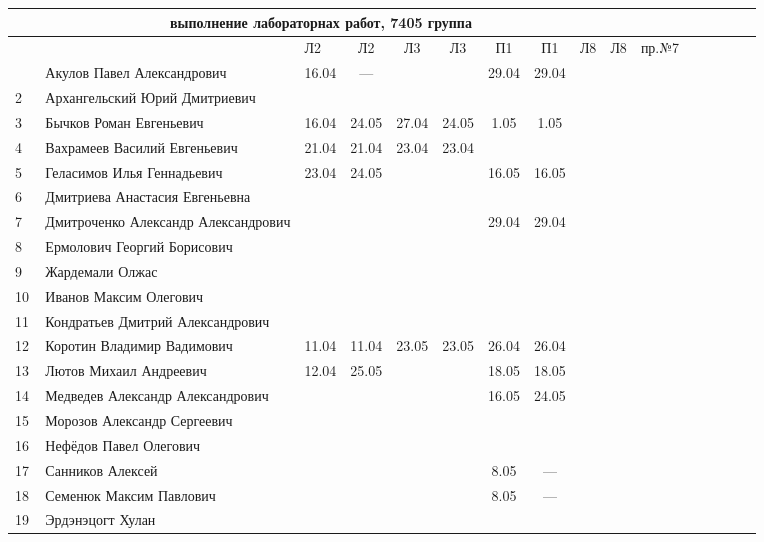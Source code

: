 \documentclass[a4paper,11pt]{article}
\begin{document}
\newpage
%
\hspace{-2cm} %
\begin{tabular}{l|llccccccccccccc}
\multicolumn{10}{c}{выполнение лабораторнах работ, 7405 группа} \\
\toprule
&&Л2&Л2& Л3&Л3& П1&П1& Л8&Л8&пр.№7\\
\midrule
\,&Акулов Павел Александрович             &16.04& --- &     &     &29.04&29.04&&&\\
2\,&Архангельский Юрий Дмитриевич         &     &     &     &     &&&&\\
3\,&Бычков Роман Евгеньевич               &16.04&24.05&27.04&24.05& 1.05& 1.05&&&\\
4\,&Вахрамеев Василий Евгеньевич          &21.04&21.04&23.04&23.04&&&&\\
5\,&Геласимов Илья Геннадьевич            &23.04&24.05&     &     &16.05&16.05&&\\
\midrule
6\,&Дмитриева Анастасия Евгеньевна        &     &     &     &     &&&&\\
7\,&Дмитроченко Александр Александрович   &     &     &     &     &29.04&29.04&&&\\
8\,&Ермолович Георгий Борисович           &     &     &     &     &&&&\\
9\,&Жардемали Олжас                       &     &     &     &     &&&&\\
10\,&Иванов Максим Олегович               &&&&&&&&\\
\midrule
11\,&Кондратьев Дмитрий Александрович     &&&&&&&&\\
12\,&Коротин Владимир Вадимович           &11.04&11.04&23.05&23.05&26.04&26.04&&&\\
13\,&Лютов Михаил Андреевич               &12.04&25.05&     &     &18.05&18.05&&\\
14\,&Медведев Александр Александрович     &     &     &     &     &16.05&24.05&&\\
15\,&Морозов Александр Сергеевич          &&&&&&&&\\
\midrule
16\,&Нефёдов Павел Олегович               &&&&&&&&\\
17\,&Санников Алексей                     &     &     &     &     & 8.05& --- &&&\\
18\,&Семенюк Максим Павлович              &     &     &     &     & 8.05& --- &&&\\
19\,&Эрдэнэцогт Хулан                     &&&&&&&&\\
\bottomrule
\end{tabular}
\end{document}
